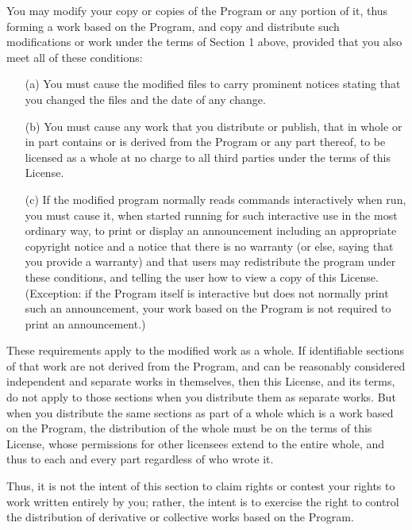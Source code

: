 \documentclass[%
	11pt,
        a4paper,
        twoside]{workrep}
\begin{document}
\gnuitem 
You may modify your copy or copies of the Program or any portion
of it, thus forming a work based on the Program, and copy and
distribute such modifications or work under the terms of Section 1
above, provided that you also meet all of these conditions:
    \begin{itemize}
    \item[(a)] You must cause the modified files to carry prominent notices
    stating that you changed the files and the date of any change.

    \item[(b)] You must cause any work that you distribute or publish, that in
    whole or in part contains or is derived from the Program or any
    part thereof, to be licensed as a whole at no charge to all third
    parties under the terms of this License.

    \item[(c)] If the modified program normally reads commands interactively
    when run, you must cause it, when started running for such
    interactive use in the most ordinary way, to print or display an
    announcement including an appropriate copyright notice and a
    notice that there is no warranty (or else, saying that you provide
    a warranty) and that users may redistribute the program under
    these conditions, and telling the user how to view a copy of this
    License.  (Exception: if the Program itself is interactive but
    does not normally print such an announcement, your work based on
    the Program is not required to print an announcement.)
    \end{itemize}

These requirements apply to the modified work as a whole.  If
identifiable sections of that work are not derived from the Program,
and can be reasonably considered independent and separate works in
themselves, then this License, and its terms, do not apply to those
sections when you distribute them as separate works.  But when you
distribute the same sections as part of a whole which is a work based
on the Program, the distribution of the whole must be on the terms of
this License, whose permissions for other licensees extend to the
entire whole, and thus to each and every part regardless of who wrote it.

Thus, it is not the intent of this section to claim rights or contest
your rights to work written entirely by you; rather, the intent is to
exercise the right to control the distribution of derivative or
collective works based on the Program.
\end{document}
